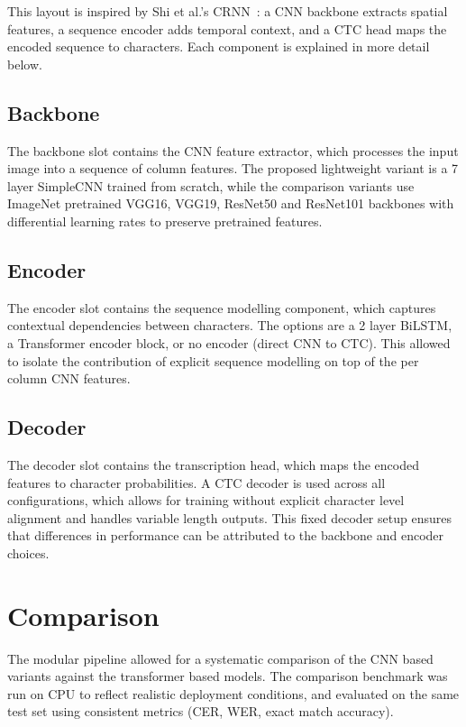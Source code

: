 This layout is inspired by Shi et al.'s CRNN~\cite{shi2017crnn}: a CNN backbone extracts spatial features, a sequence encoder adds temporal context, and a CTC head maps the encoded sequence to characters. Each component is explained in more detail below.

\subsection{Backbone}
\label{subsec:backbone}

The backbone slot contains the CNN feature extractor, which processes the input image into a sequence of column features. The proposed lightweight variant is a 7 layer SimpleCNN trained from scratch, while the comparison variants use ImageNet pretrained VGG16, VGG19, ResNet50 and ResNet101 backbones with differential learning rates to preserve pretrained features.

\subsection{Encoder}
\label{subsec:encoder}

The encoder slot contains the sequence modelling component, which captures contextual dependencies between characters. The options are a 2 layer BiLSTM, a Transformer encoder block, or no encoder (direct CNN to CTC). This allowed to isolate the contribution of explicit sequence modelling on top of the per column CNN features.

\subsection{Decoder}
\label{subsec:decoder}

The decoder slot contains the transcription head, which maps the encoded features to character probabilities. A CTC decoder \cite{graves2006ctc} is used across all configurations, which allows for training without explicit character level alignment and handles variable length outputs. This fixed decoder setup ensures that differences in performance can be attributed to the backbone and encoder choices.

\section{Comparison}
\label{sec:comparison}

The modular pipeline allowed for a systematic comparison of the CNN based variants against the transformer based models. The comparison benchmark was run on CPU to reflect realistic deployment conditions, and evaluated on the same test set using consistent metrics (CER, WER, exact match accuracy).

